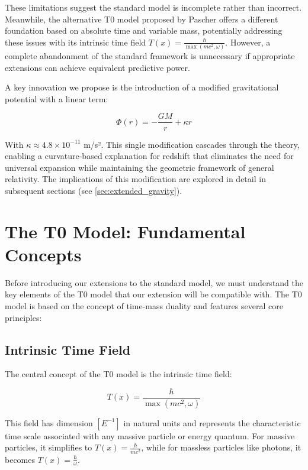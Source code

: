 \documentclass[12pt,a4paper]{article}
\newcommand{\Tfield}{T(x)}
\begin{document}
	These limitations suggest the standard model is incomplete rather than incorrect. Meanwhile, the alternative T0 model proposed by Pascher offers a different foundation based on absolute time and variable mass\cite{pascher_zeit_2025}, potentially addressing these issues with its intrinsic time field $\Tfield = \frac{\hbar}{\max(mc^2, \omega)}$\cite{pascher_lagrange_2025}. However, a complete abandonment of the standard framework is unnecessary if appropriate extensions can achieve equivalent predictive power.
	
	A key innovation we propose is the introduction of a modified gravitational potential with a linear term:
	
	\begin{equation}
		\label{eq:modified_potential}
		\Phi(r) = -\frac{GM}{r} + \kappa r
	\end{equation}
	
	With $\kappa \approx 4.8\times10^{-11}$ m/s²\cite{pascher_params_2025}. This single modification cascades through the theory, enabling a curvature-based explanation for redshift that eliminates the need for universal expansion while maintaining the geometric framework of general relativity. The implications of this modification are explored in detail in subsequent sections (see \cref{sec:extended_gravity}).
	
	\section{The T0 Model: Fundamental Concepts}
	\label{sec:t0_model_fundamentals}
	
	Before introducing our extensions to the standard model, we must understand the key elements of the T0 model that our extension will be compatible with. The T0 model is based on the concept of time-mass duality\cite{pascher_zeit_masse_2025} and features several core principles:
	
	\subsection{Intrinsic Time Field}
	\label{subsec:intrinsic_time}
	
	The central concept of the T0 model is the intrinsic time field:
	
	\begin{equation}
		\label{eq:intrinsic_time}
		\Tfield = \frac{\hbar}{\max(mc^2, \omega)}
	\end{equation}
	
	This field has dimension $[E^{-1}]$ in natural units\cite{pascher_alpha_2025} and represents the characteristic time scale associated with any massive particle or energy quantum. For massive particles, it simplifies to $\Tfield = \frac{\hbar}{mc^2}$, while for massless particles like photons, it becomes $\Tfield = \frac{\hbar}{\omega}$.
	
\end{document}
